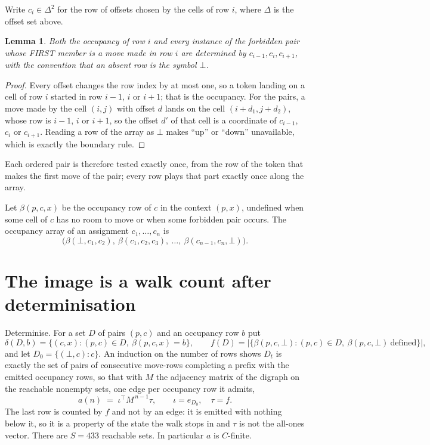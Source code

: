 \documentclass[11pt,a4paper]{article}
\theoremstyle{plain}
\newtheorem{lemma}[theorem]{Lemma}
\theoremstyle{definition}
\begin{document}
Write $c_i\in\Delta^{2}$ for the row of offsets chosen by the cells of row $i$, where
$\Delta$ is the offset set above.

\begin{lemma}\label{lem:win}
Both the occupancy of row $i$ and every instance of the forbidden pair whose FIRST member is a
move made in row $i$ are determined by $c_{i-1},c_i,c_{i+1}$, with the convention that an
absent row is the symbol $\bot$.
\end{lemma}

\begin{proof}
Every offset changes the row index by at most one, so a token landing on a cell of row $i$
started in row $i-1$, $i$ or $i+1$; that is the occupancy. For the pairs, a move made by the
cell $(i,j)$ with offset $d$ lands on the cell $(i+d_1,j+d_2)$, whose row is $i-1$, $i$ or
$i+1$, so the offset $d'$ of that cell is a coordinate of $c_{i-1}$, $c_i$ or $c_{i+1}$.
Reading a row of the array as $\bot$ makes ``up'' or ``down'' unavailable, which is exactly
the boundary rule.
\end{proof}

Each ordered pair is therefore tested exactly once, from the row of the token that makes the
first move of the pair; every row plays that part exactly once along the array.

Let $\beta(p,c,x)$ be the occupancy row of $c$ in the context $(p,x)$, undefined when some
cell of $c$ has no room to move or when some forbidden pair occurs. The occupancy array of an
assignment $c_1,\dots,c_n$ is
\[
\bigl(\beta(\bot,c_1,c_2),\ \beta(c_1,c_2,c_3),\ \dots,\ \beta(c_{n-1},c_n,\bot)\bigr).
\]

\section{The image is a walk count after determinisation}

Determinise. For a set $D$ of pairs $(p,c)$ and an occupancy row $b$ put
\[
\delta(D,b)=\{(c,x):(p,c)\in D,\ \beta(p,c,x)=b\},\qquad
f(D)=\bigl|\{\beta(p,c,\bot):(p,c)\in D,\ \beta(p,c,\bot)\ \text{defined}\}\bigr| ,
\]
and let $D_0=\{(\bot,c):c\}$. An induction on the number of rows shows $D_t$ is exactly the
set of pairs of consecutive move-rows completing a prefix with the emitted occupancy rows, so
that with $M$ the adjacency matrix of the digraph on the reachable nonempty sets, one edge per
occupancy row it admits,
\[
a(n)\;=\;\iota^{\!\top}M^{\,n-1}\tau,\qquad \iota=e_{D_0},\quad \tau=f .
\]
The last row is counted by $f$ and not by an edge: it is emitted with nothing below it, so it
is a property of the state the walk stops in and $\tau$ is not the all-ones vector. There are
$S=433$ reachable sets. In particular $a$ is $C$-finite.
\end{document}
